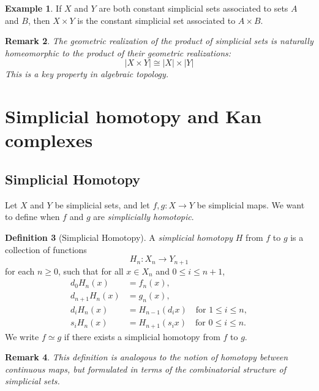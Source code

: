 \documentclass[11pt]{article}
\theoremstyle{definition}
\newtheorem{definition}{Definition}[section]
\newtheorem{example}[definition]{Example}
\theoremstyle{plain}
\newtheorem{remark}[definition]{Remark}
\begin{document}
\begin{example}
    If $X$ and $Y$ are both constant simplicial sets associated to sets $A$ and $B$, then $X \times Y$ is the constant simplicial set associated to $A \times B$.
\end{example}

\begin{remark}
    The geometric realization of the product of simplicial sets is naturally homeomorphic to the product of their geometric realizations:
    \[
        |X \times Y| \cong |X| \times |Y|
    \]
    This is a key property in algebraic topology.
\end{remark}










\section{Simplicial homotopy and Kan complexes}


\subsection{Simplicial Homotopy}

Let $X$ and $Y$ be simplicial sets, and let $f, g : X \to Y$ be simplicial maps. We want to define when $f$ and $g$ are \emph{simplicially homotopic}.

\begin{definition}[Simplicial Homotopy]
    A \emph{simplicial homotopy} $H$ from $f$ to $g$ is a collection of functions
    \[
        H_n : X_n \to Y_{n+1}
    \]
    for each $n \geq 0$, such that for all $x \in X_n$ and $0 \leq i \leq n+1$,
    \begin{align*}
        d_0 H_n(x)     & = f_n(x),                                           \\
        d_{n+1} H_n(x) & = g_n(x),                                           \\
        d_i H_n(x)     & = H_{n-1}(d_i x) \quad \text{for } 1 \leq i \leq n, \\
        s_i H_n(x)     & = H_{n+1}(s_i x) \quad \text{for } 0 \leq i \leq n.
    \end{align*}
    We write $f \simeq g$ if there exists a simplicial homotopy from $f$ to $g$.
\end{definition}

\begin{remark}
    This definition is analogous to the notion of homotopy between continuous maps, but formulated in terms of the combinatorial structure of simplicial sets.
\end{remark}
\end{document}
